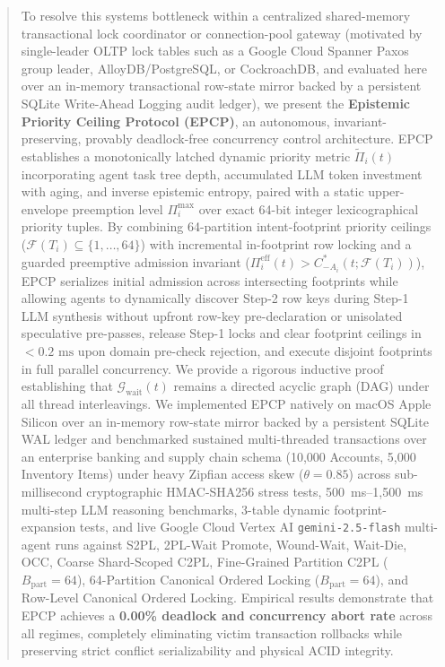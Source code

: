 \documentclass[conference,10pt]{IEEEtran}
\begin{document}
\begin{abstract}
To resolve this systems bottleneck within a centralized shared-memory transactional lock coordinator or connection-pool gateway (motivated by single-leader OLTP lock tables such as a Google Cloud Spanner Paxos group leader, AlloyDB/PostgreSQL, or CockroachDB, and evaluated here over an in-memory transactional row-state mirror backed by a persistent SQLite Write-Ahead Logging audit ledger), we present the \textbf{Epistemic Priority Ceiling Protocol (EPCP)}, an autonomous, invariant-preserving, provably deadlock-free concurrency control architecture. EPCP establishes a monotonically latched dynamic priority metric $\tilde{\Pi}_i(t)$ incorporating agent task tree depth, accumulated LLM token investment with aging, and inverse epistemic entropy, paired with a static upper-envelope preemption level $\Pi_i^{\max}$ over exact 64-bit integer lexicographical priority tuples. By combining 64-partition intent-footprint priority ceilings ($\mathcal{F}(T_i) \subseteq \{1, \dots, 64\}$) with incremental in-footprint row locking and a guarded preemptive admission invariant ($\Pi_i^{\text{eff}}(t) > C_{-A_i}^*(t; \mathcal{F}(T_i))$), EPCP serializes initial admission across intersecting footprints while allowing agents to dynamically discover Step-2 row keys during Step-1 LLM synthesis without upfront row-key pre-declaration or unisolated speculative pre-passes, release Step-1 locks and clear footprint ceilings in $<0.2\text{ ms}$ upon domain pre-check rejection, and execute disjoint footprints in full parallel concurrency. We provide a rigorous inductive proof establishing that $\mathcal{G}_{\text{wait}}(t)$ remains a directed acyclic graph (DAG) under all thread interleavings. We implemented EPCP natively on macOS Apple Silicon over an in-memory row-state mirror backed by a persistent SQLite WAL ledger and benchmarked sustained multi-threaded transactions over an enterprise banking and supply chain schema (10,000 Accounts, 5,000 Inventory Items) under heavy Zipfian access skew ($\theta = 0.85$) across sub-millisecond cryptographic HMAC-SHA256 stress tests, 500~ms--1,500~ms multi-step LLM reasoning benchmarks, 3-table dynamic footprint-expansion tests, and live Google Cloud Vertex AI \texttt{gemini-2.5-flash} multi-agent runs against S2PL, 2PL-Wait Promote, Wound-Wait, Wait-Die, OCC, Coarse Shard-Scoped C2PL, Fine-Grained Partition C2PL ($B_{\text{part}}=64$), 64-Partition Canonical Ordered Locking ($B_{\text{part}}=64$), and Row-Level Canonical Ordered Locking. Empirical results demonstrate that EPCP achieves a \textbf{0.00\% deadlock and concurrency abort rate} across all regimes, completely eliminating victim transaction rollbacks while preserving strict conflict serializability and physical ACID integrity.
\end{abstract}
\end{document}
